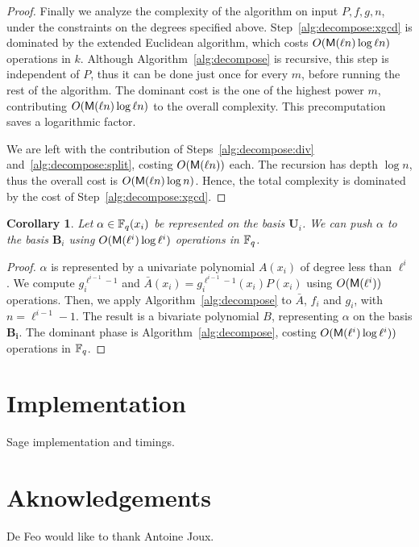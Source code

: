 \documentclass{sig-alternate}
\newtheorem{corollary}[definition]{Corollary}
\newcommand{\bb}{\mathbf{B}}
\newcommand{\uu}{\mathbf{U}}  %
\begin{document}
\begin{proof}
  Finally we analyze the complexity of the algorithm on input $P, f,
  g, n$, under the constraints on the degrees specified
  above. Step~\ref{alg:decompose:xgcd} is dominated by the extended
  Euclidean algorithm, which costs $O(\mathsf{M}(\ell n)\log \ell n)$
  operations in $k$. Although Algorithm~\ref{alg:decompose} is
  recursive, this step is independent of $P$, thus it can be done just
  once for every $m$, before running the rest of the algorithm. The
  dominant cost is the one of the highest power $m$, contributing
  $O(\mathsf{M}(\ell n)\log \ell n)$ to the overall complexity. This
  precomputation saves a logarithmic factor.

  We are left with the contribution of Steps~\ref{alg:decompose:div}
  and~\ref{alg:decompose:split}, costing $O(\mathsf{M}(\ell n))$ each. The
  recursion has depth $\log n$, thus the overall cost is $O(\mathsf{M}(\ell
  n)\log n)$. Hence, the total complexity is dominated by the cost of
  Step~\ref{alg:decompose:xgcd}.
\end{proof}

\begin{corollary}
  Let $\alpha\in\mathbb{F}_q(x_i)$ be represented on the basis $\uu_i$. We
  can \emph{push} $\alpha$ to the basis $\bb_i$ using
  $O(\mathsf{M}(\ell^i)\log\ell^i)$ operations in $\mathbb{F}_q$.
\end{corollary}
\begin{proof}
  $\alpha$ is represented by a univariate polynomial $A(x_i)$ of degree
  less than $\ell^i$. We compute $g_i^{\ell^{i-1}-1}$ and $\bar{A}(x_i) =
  g_i^{\ell^{i-1}-1}(x_i)P(x_i)$ using $O(\mathsf{M}(\ell^i))$ operations. Then,
  we apply Algorithm~\ref{alg:decompose} to $\bar{A}$, $f_i$ and $g_i$,
  with $n=\ell^{i-1}-1$. The result is a bivariate polynomial $B$,
  representing $\alpha$ on the basis $\mathbf{B_i}$. The dominant phase
  is Algorithm~\ref{alg:decompose}, costing
  $O(\mathsf{M}(\ell^i)\log\ell^i))$ operations in $\mathbb{F}_q$.
\end{proof}


\section{Implementation}
\label{sec:impl}

Sage implementation and timings.


\section{Aknowledgements}
De Feo would like to thank Antoine Joux.

\scriptsize


\end{document}
